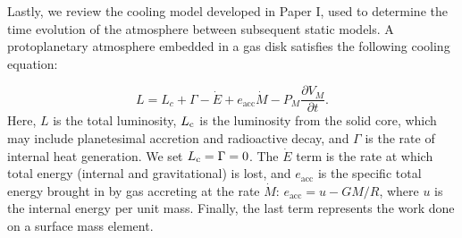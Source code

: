 \documentclass[apj]{emulateapj}
\newcommand{\co}{_{\rm c}}
\begin{document}






Lastly, we review the cooling model developed in Paper I, used to determine the time evolution of the atmosphere between subsequent static models. A protoplanetary atmosphere embedded in a gas disk satisfies the following cooling equation:

\begin{equation}
\label{eq:coolingglobal}
L=L_c+\Gamma-\dot{E}+e_{\mathrm{acc}}\dot{M}-P_M \frac{\partial V_M}{\partial t}.
\end{equation}
Here, $L$ is the total luminosity, $L_{\rm c}$ is the luminosity from the solid core, which may include planetesimal accretion and radioactive decay, and $\Gamma$ is the rate of internal heat generation. We set $L\co=\Gamma=0$. The $\dot{E}$ term is the rate at which total energy (internal and gravitational) is lost, and $e_{\mathrm{acc}}$ is the specific total energy brought in by gas accreting at the rate $\dot{M}$: $e_{\mathrm{acc}}=u-G M/R$, where $u$ is the internal energy per unit mass. Finally, the last term represents the work done on a surface mass element. 
\end{document}
